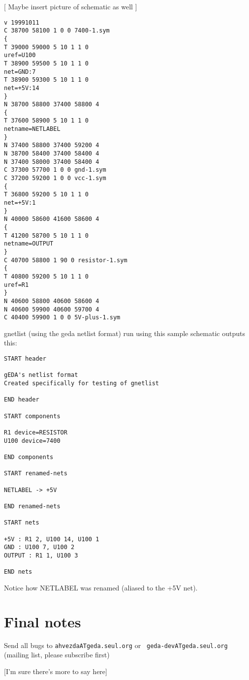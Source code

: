 \documentclass{article}
\begin{document}
	[ Maybe insert picture of schematic as well ]
	
\begin{verbatim}
v 19991011
C 38700 58100 1 0 0 7400-1.sym
{
T 39000 59000 5 10 1 1 0
uref=U100
T 38900 59500 5 10 1 1 0
net=GND:7
T 38900 59300 5 10 1 1 0
net=+5V:14
}
N 38700 58800 37400 58800 4
{
T 37600 58900 5 10 1 1 0
netname=NETLABEL
}
N 37400 58800 37400 59200 4
N 38700 58400 37400 58400 4
N 37400 58000 37400 58400 4
C 37300 57700 1 0 0 gnd-1.sym
C 37200 59200 1 0 0 vcc-1.sym
{
T 36800 59200 5 10 1 1 0
net=+5V:1
}
N 40000 58600 41600 58600 4
{
T 41200 58700 5 10 1 1 0
netname=OUTPUT
}
C 40700 58800 1 90 0 resistor-1.sym
{
T 40800 59200 5 10 1 1 0
uref=R1
}
N 40600 58800 40600 58600 4
N 40600 59900 40600 59700 4
C 40400 59900 1 0 0 5V-plus-1.sym
\end{verbatim}

	gnetlist (using the geda netlist format) run using this
sample schematic outputs this:

\begin{verbatim}
START header

gEDA's netlist format
Created specifically for testing of gnetlist

END header

START components

R1 device=RESISTOR
U100 device=7400

END components

START renamed-nets

NETLABEL -> +5V

END renamed-nets

START nets

+5V : R1 2, U100 14, U100 1 
GND : U100 7, U100 2 
OUTPUT : R1 1, U100 3 

END nets
\end{verbatim}
Notice how NETLABEL was renamed (aliased to the +5V net).  	



\section{Final notes}
Send all bugs to {\tt ahvezdaATgeda.seul.org} or {\tt
  geda-devATgeda.seul.org} (mailing list, please subscribe first) 

[I'm sure there's more to say here]
\end{document}

